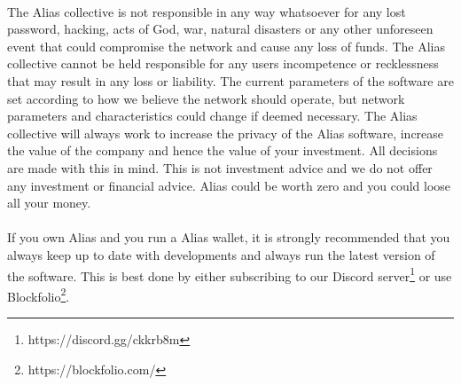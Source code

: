 \\
The Alias collective is not responsible in any way whatsoever for any lost password, hacking, acts of God, war, natural disasters or any other
 unforeseen event
that could compromise the network and cause any loss of funds. The Alias collective
cannot be held responsible for any users incompetence or recklessness that may
result in any loss or liability. The current parameters of the software are set
according to how we believe the network should operate, but network parameters
and characteristics could change if deemed necessary. The Alias collective will always
work to increase the privacy of the Alias software, increase the value of
the company and hence the value of your investment. All decisions are made with
this in mind. This is not investment advice and we do not offer any investment
or financial advice. Alias could be worth zero and you could loose all your money.
\\
\\
If you own Alias and you run a Alias wallet, it is strongly
recommended that you always keep up to date with developments and always run
the latest version of the software. This is best done by either subscribing
to our Discord server\footnote{https://discord.gg/ckkrb8m} or use 
Blockfolio\footnote{https://blockfolio.com/}.
